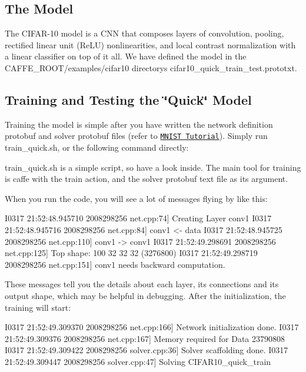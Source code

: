 \subsection*{The Model }

The C\+I\+F\+A\+R-\/10 model is a C\+NN that composes layers of convolution, pooling, rectified linear unit (Re\+LU) nonlinearities, and local contrast normalization with a linear classifier on top of it all. We have defined the model in the {\ttfamily C\+A\+F\+F\+E\+\_\+\+R\+O\+O\+T/examples/cifar10} directory\textquotesingle{}s {\ttfamily cifar10\+\_\+quick\+\_\+train\+\_\+test.\+prototxt}.

\subsection*{Training and Testing the \char`\"{}\+Quick\char`\"{} Model }

Training the model is simple after you have written the network definition protobuf and solver protobuf files (refer to \href{../examples/mnist.html}{\tt M\+N\+I\+ST Tutorial}). Simply run {\ttfamily train\+\_\+quick.\+sh}, or the following command directly\+: 


{\ttfamily train\+\_\+quick.\+sh} is a simple script, so have a look inside. The main tool for training is {\ttfamily caffe} with the {\ttfamily train} action, and the solver protobuf text file as its argument.

When you run the code, you will see a lot of messages flying by like this\+: \begin{DoxyVerb}I0317 21:52:48.945710 2008298256 net.cpp:74] Creating Layer conv1
I0317 21:52:48.945716 2008298256 net.cpp:84] conv1 <- data
I0317 21:52:48.945725 2008298256 net.cpp:110] conv1 -> conv1
I0317 21:52:49.298691 2008298256 net.cpp:125] Top shape: 100 32 32 32 (3276800)
I0317 21:52:49.298719 2008298256 net.cpp:151] conv1 needs backward computation.
\end{DoxyVerb}


These messages tell you the details about each layer, its connections and its output shape, which may be helpful in debugging. After the initialization, the training will start\+: \begin{DoxyVerb}I0317 21:52:49.309370 2008298256 net.cpp:166] Network initialization done.
I0317 21:52:49.309376 2008298256 net.cpp:167] Memory required for Data 23790808
I0317 21:52:49.309422 2008298256 solver.cpp:36] Solver scaffolding done.
I0317 21:52:49.309447 2008298256 solver.cpp:47] Solving CIFAR10_quick_train
\end{DoxyVerb}


